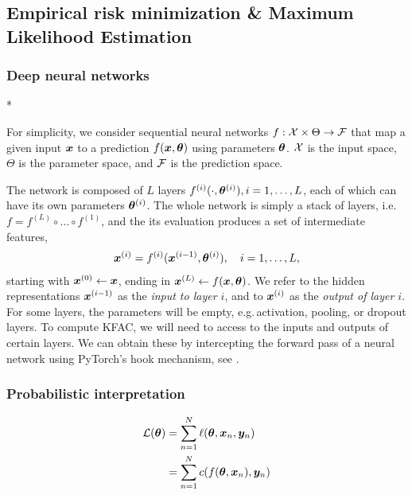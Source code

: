 \subsection{Empirical risk minimization \& Maximum Likelihood Estimation}

\subsubsection{Deep neural networks}

\switchcolumn[1]*
\switchcolumn[0]

For simplicity, we consider sequential neural networks $f: {\mathcal{X}} \times \Theta \to {\mathcal{F}}$ that map a given input ${\bm{x}}$ to a prediction $f({\bm{x}}, {\bm{\theta}})$ using parameters ${\bm{\theta}}$.
${\mathcal{X}}$ is the input space, $\Theta$ is the parameter space, and ${\mathcal{F}}$ is the prediction space.

The network is composed of $L$ layers $f^{(i)}(\cdot, {\bm{\theta}}^{(i)}), i=1,\dots, L$, each of which can have its own parameters ${\bm{\theta}}^{(i)}$.
The whole network is simply a stack of layers, i.e.
$f = f^{(L)} \circ \dots \circ f^{(1)}$, and the its evaluation produces a set of intermediate features,
\begin{align*}
  {\bm{x}}^{(i)} = f^{(i)}({\bm{x}}^{(i-1)}, {\bm{\theta}}^{(i)}), \quad i=1,\dots, L,
\end{align*}
starting with ${\bm{x}}^{(0)} \leftarrow {\bm{x}}$, ending in ${\bm{x}}^{(L)} \leftarrow f({\bm{x}}, {\bm{\theta}})$.
We refer to the hidden representations ${\bm{x}}^{(i-1)}$ as the \emph{input to layer $i$}, and to ${\bm{x}}^{(i)}$ as the \emph{output of layer $i$}.
For some layers, the parameters will be empty, e.g.\,activation, pooling, or dropout layers.
To compute KFAC, we will need to access to the inputs and outputs of certain layers. We can obtain these by intercepting the forward pass of a neural network using PyTorch's hook mechanism, see .

\subsubsection{Probabilistic interpretation}


\begin{align}
  {\mathcal{L}}({\bm{\theta}}) &= \sum_{n=1}^N \ell({\bm{\theta}}, {\bm{x}}_n, {\bm{y}}_n)
  \\
               &=
                 \sum_{n=1}^N c(f({\bm{\theta}}, {\bm{x}}_n), {\bm{y}}_n)
\end{align}

\switchcolumn[0]

